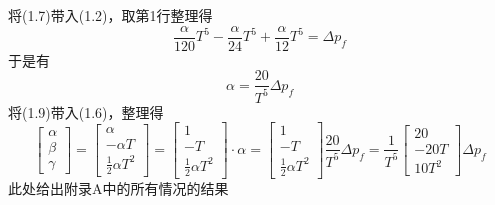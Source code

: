 \documentclass[40pt,a4paper,UTF8]{ctexart}
\numberwithin{equation}{section}
\begin{document}
\begin{enumerate}
\begin{enumerate}
将(1.7)带入(1.2)，取第1行整理得
\begin{equation}
\frac{\alpha}{120}T^5 - \frac{\alpha}{24}T^5 +\frac{\alpha}{12}T^5=\Delta p_f
\end{equation}
于是有
\begin{equation}
\alpha = \frac{20}{T^5}\Delta p_f
\end{equation}
将(1.9)带入(1.6)，整理得
\begin{equation}
    \begin{bmatrix}
        \alpha \\ \beta \\ \gamma
    \end{bmatrix}
=
\begin{bmatrix}
    \alpha \\ -\alpha T \\ \frac{1}{2}\alpha T^2
\end{bmatrix}
=
\begin{bmatrix}
    1 \\ -T \\ \frac{1}{2}\alpha T^2
\end{bmatrix} \cdot \alpha
=
\begin{bmatrix}
    1 \\ -T \\ \frac{1}{2}\alpha T^2
\end{bmatrix} \frac{20}{T^5}\Delta p_f
=\frac{1}{T^5}
\begin{bmatrix}
    20 \\ -20T \\ 10T^2
\end{bmatrix} \Delta p_f
\end{equation}
此处给出\cite{ref1}附录A中的所有情况的结果
\begin{figure}[H]
    \centering

\end{figure}
\end{enumerate}
\end{enumerate}
\end{document}
